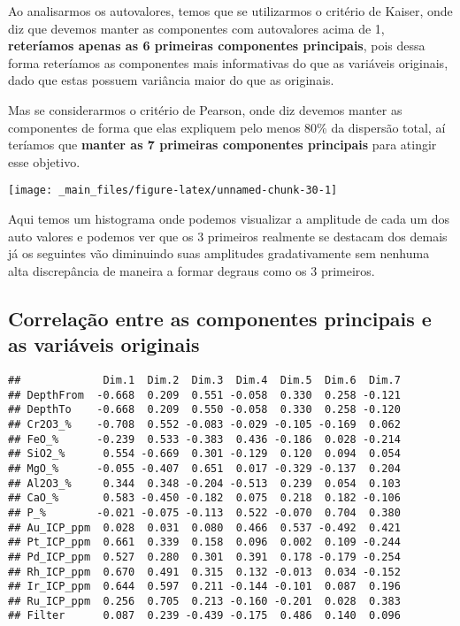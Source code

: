 \documentclass[
]{article}
\begin{document}
Ao analisarmos os autovalores, temos que se utilizarmos o critério de Kaiser, onde diz que devemos manter as componentes com autovalores acima de 1, \textbf{reteríamos apenas as 6 primeiras componentes principais}, pois dessa forma reteríamos as componentes mais informativas do que as variáveis originais, dado que estas possuem variância maior do que as originais.

Mas se considerarmos o critério de Pearson, onde diz devemos manter as componentes de forma que elas expliquem pelo menos 80\% da dispersão total, aí teríamos que \textbf{manter as 7 primeiras componentes principais} para atingir esse objetivo.

\begin{center}\texttt{[image: \_main\_files/figure-latex/unnamed-chunk-30-1]} \end{center}

Aqui temos um histograma onde podemos visualizar a amplitude de cada um dos auto valores e podemos ver que os 3 primeiros realmente se destacam dos demais já os seguintes vão diminuindo suas amplitudes gradativamente sem nenhuma alta discrepância de maneira a formar degraus como os 3 primeiros.

\hypertarget{correlauxe7uxe3o-entre-as-componentes-principais-e-as-variuxe1veis-originais}{%
\subsection{Correlação entre as componentes principais e as variáveis originais}\label{correlauxe7uxe3o-entre-as-componentes-principais-e-as-variuxe1veis-originais}}

\begin{verbatim}
##             Dim.1  Dim.2  Dim.3  Dim.4  Dim.5  Dim.6  Dim.7
## DepthFrom  -0.668  0.209  0.551 -0.058  0.330  0.258 -0.121
## DepthTo    -0.668  0.209  0.550 -0.058  0.330  0.258 -0.120
## Cr2O3_%    -0.708  0.552 -0.083 -0.029 -0.105 -0.169  0.062
## FeO_%      -0.239  0.533 -0.383  0.436 -0.186  0.028 -0.214
## SiO2_%      0.554 -0.669  0.301 -0.129  0.120  0.094  0.054
## MgO_%      -0.055 -0.407  0.651  0.017 -0.329 -0.137  0.204
## Al2O3_%     0.344  0.348 -0.204 -0.513  0.239  0.054  0.103
## CaO_%       0.583 -0.450 -0.182  0.075  0.218  0.182 -0.106
## P_%        -0.021 -0.075 -0.113  0.522 -0.070  0.704  0.380
## Au_ICP_ppm  0.028  0.031  0.080  0.466  0.537 -0.492  0.421
## Pt_ICP_ppm  0.661  0.339  0.158  0.096  0.002  0.109 -0.244
## Pd_ICP_ppm  0.527  0.280  0.301  0.391  0.178 -0.179 -0.254
## Rh_ICP_ppm  0.670  0.491  0.315  0.132 -0.013  0.034 -0.152
## Ir_ICP_ppm  0.644  0.597  0.211 -0.144 -0.101  0.087  0.196
## Ru_ICP_ppm  0.256  0.705  0.213 -0.160 -0.201  0.028  0.383
## Filter      0.087  0.239 -0.439 -0.175  0.486  0.140  0.096
\end{verbatim}
\end{document}
